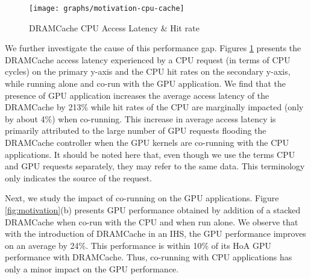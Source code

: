 \begin{figure}[htb]
	\centering
	\texttt{[image: graphs/motivation-cpu-cache]}
	\caption{DRAMCache CPU Access Latency \& Hit rate}
	\label{fig:motivation-cpu-cache}
\end{figure}

\par We further investigate the cause of this performance gap. Figures \ref{fig:motivation-cpu-cache} presents the DRAMCache access latency experienced by a CPU request (in terms of CPU cycles) on the primary y-axis and the CPU hit rates on the secondary y-axis, while running alone and co-run with the GPU application. We find that the presence of GPU application increases the average access latency of the DRAMCache by 213\% while hit rates of the CPU are marginally impacted (only by about 4\%) when co-running.
This increase in average access latency is primarily attributed to the large
number of GPU requests flooding the DRAMCache controller when the GPU kernels are co-running with the CPU applications.
It should be noted here that, even though we use the terms CPU and GPU requests separately, they may refer to the same data. This terminology only indicates the source of the request. 
\par Next, we study the impact of co-running on the GPU applications. Figure \ref{fig:motivation}(b) presents GPU performance obtained by addition of a stacked DRAMCache when co-run with the CPU and when run alone.
We observe that with the introduction of DRAMCache in an IHS, the GPU performance improves on an average by 24\%. This performance is within 10\% of its HoA GPU performance with DRAMCache. 
Thus, co-running with CPU applications has only a minor impact on the GPU performance. 
